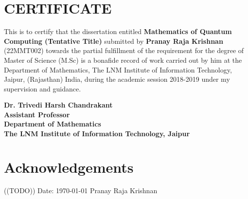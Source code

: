 \documentclass[12pt,twoside]{report}
\begin{document}
\renewcommand{\sectionmark}[1]{\markright{#1}}

\chapter*{\centering CERTIFICATE}

This is to certify that the dissertation entitled \textbf{Mathematics of Quantum Computing (Tentative Title)} submitted by \textbf{Pranay Raja Krishnan} (22MMT002) towards the partial fulfillment of the requirement for the degree of Master of Science (M.Sc) is a bonafide record of work carried out by him at the Department of Mathematics, The LNM Institute of Information Technology, Jaipur, (Rajasthan) India, during the academic session 2018-2019 under my supervision and guidance. \\
\vspace*{3cm}
\begin{flushright}
	\hfill
	{\parbox{7cm}{\textbf{Dr. Trivedi Harsh Chandrakant\\
	Assistant Professor\\
	Department of Mathematics\\
	The LNM Institute of Information Technology, Jaipur}}}
\end{flushright}

\chapter*{\centering Acknowledgements}
\centering ((TODO))
\vspace*{3cm}
Date: \today
\hfill{}
Pranay Raja Krishnan
\end{document}
